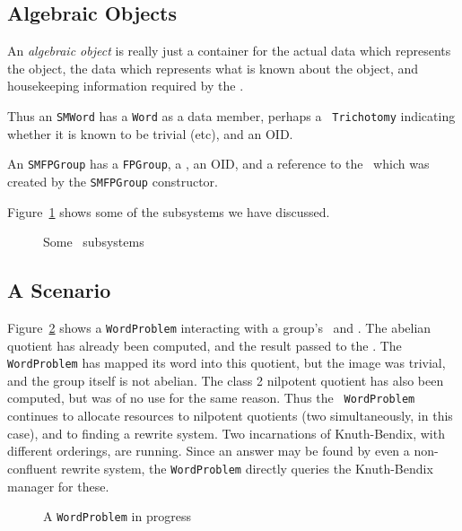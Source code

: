 \subsection{Algebraic Objects}\label{algebraic_objects}

An {\em algebraic object} is really just a container for the actual
data which represents the object, the data which represents what is
known about the object, and housekeeping information required by the
\SM.

Thus an {\tt SMWord} has a {\tt Word} as a data member, perhaps a {\tt
Trichotomy} indicating whether it is known to be trivial (etc), and an
OID.

An {\tt SMFPGroup} has a {\tt FPGroup}, a \GIC, an OID, and a
reference to the \GCM\ which was created by the {\tt SMFPGroup}
constructor.

Figure~\ref{subsystems} shows some of the subsystems we have
discussed.

\begin{figure}[hbtp]
\caption{Some \SM\ subsystems}\label{subsystems}
\end{figure}


\subsection{A Scenario}

Figure~\ref{wordprob1} shows a {\tt WordProblem} interacting with a
group's \GCM\ and \GIC. The abelian quotient has already been computed,
and the result passed to the \GIC. The {\tt WordProblem} has mapped
its word into this quotient, but the image was trivial, and the group
itself is not abelian. The class 2 nilpotent quotient has also been
computed, but was of no use for the same reason. Thus the {\tt
WordProblem} continues to allocate resources to nilpotent quotients
(two simultaneously, in this case), and to finding a rewrite system.
Two incarnations of Knuth-Bendix, with different orderings, are
running.  Since an answer may be found by even a non-confluent rewrite
system, the {\tt WordProblem} directly queries the Knuth-Bendix
manager for these.

\begin{figure}[hbtp]
\caption{A {\tt WordProblem} in progress}\label{wordprob1}
\end{figure}

